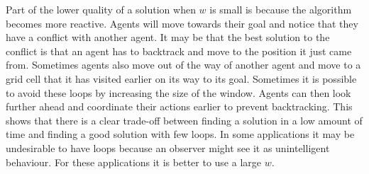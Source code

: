 Part of the lower quality of a solution when $w$ is small is because the
algorithm becomes more reactive. Agents will move towards their goal and notice
that they have a conflict with another agent. It may be that the best solution
to the conflict is that an agent has to backtrack and move to the position it
just came from.
Sometimes agents also move out of the way of another agent and move to a grid
cell that it has visited earlier on its way to its goal. Sometimes it is
possible to avoid these loops by increasing the size of the window. Agents can
then look further ahead and coordinate their actions earlier to prevent
backtracking. This shows that there is a clear trade-off between finding a
solution in a low amount of time and finding a good solution with few loops. In
some applications it may be undesirable to have loops because an observer might
see it as unintelligent behaviour. For these applications it is better to use a
large $w$.


